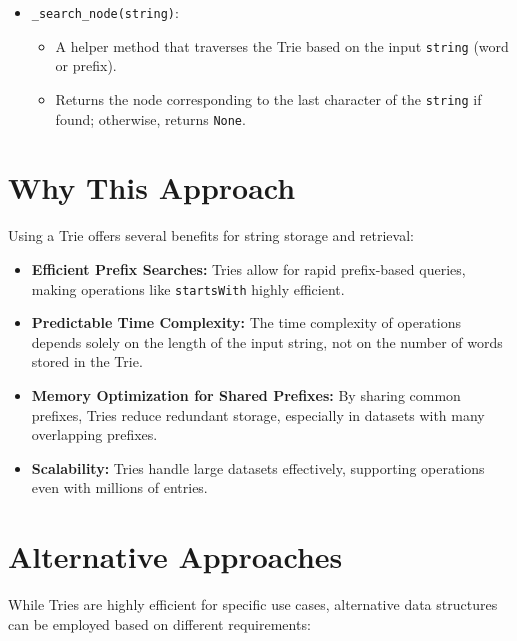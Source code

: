 \begin{itemize}
\begin{itemize}
        \item \texttt{\_search\_node(string)}:
        \begin{itemize}
            \item A helper method that traverses the Trie based on the input \texttt{string} (word or prefix).
            \item Returns the node corresponding to the last character of the \texttt{string} if found; otherwise, returns \texttt{None}.
        \end{itemize}
    \end{itemize}
\end{itemize}

\section*{Why This Approach}

Using a Trie offers several benefits for string storage and retrieval:

\begin{itemize}
    \item \textbf{Efficient Prefix Searches:} Tries allow for rapid prefix-based queries, making operations like \texttt{startsWith} highly efficient.
    
    \item \textbf{Predictable Time Complexity:} The time complexity of operations depends solely on the length of the input string, not on the number of words stored in the Trie.
    
    \item \textbf{Memory Optimization for Shared Prefixes:} By sharing common prefixes, Tries reduce redundant storage, especially in datasets with many overlapping prefixes.
    
    \item \textbf{Scalability:} Tries handle large datasets effectively, supporting operations even with millions of entries.
\end{itemize}

\section*{Alternative Approaches}

While Tries are highly efficient for specific use cases, alternative data structures can be employed based on different requirements:

